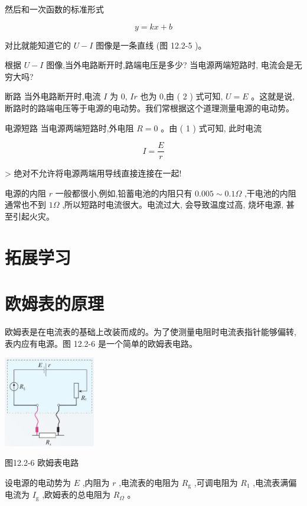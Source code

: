 \documentclass[10pt]{article}
\begin{document}
然后和一次函数的标准形式

\[
y = {kx} + b
\]

对比就能知道它的 \(U - I\) 图像是一条直线 (图 12.2-5 )。

根据 \(U - I\) 图像,当外电路断开时,路端电压是多少? 当电源两端短路时, 电流会是无穷大吗?

断路 当外电路断开时,电流 \(I\) 为 0, \({Ir}\) 也为 0,由 ( 2 ) 式可知, \(U = E\) 。这就是说,断路时的路端电压等于电源的电动势。我们常根据这个道理测量电源的电动势。

电源短路 当电源两端短路时,外电阻 \(R = 0\) 。由 ( 1 ) 式可知, 此时电流

\[
I = \frac{E}{r}
\]

\begin{mdframed}

> 绝对不允许将电源两端用导线直接连接在一起!

\end{mdframed}

电源的内阻 \(r\) 一般都很小,例如,铅蓄电池的内阻只有 \({0.005} \sim {0.1\Omega }\) ,干电池的内阻通常也不到 \({1\Omega }\) ,所以短路时电流很大。电流过大, 会导致温度过高, 烧坏电源, 甚至引起火灾。

\section*{拓展学习}

\section*{欧姆表的原理}

欧姆表是在电流表的基础上改装而成的。为了使测量电阻时电流表指针能够偏转, 表内应有电源。图 12.2-6 是一个简单的欧姆表电路。

\begin{center}
\includegraphics[max width=0.3\textwidth]{images/01911d5f-8e38-70c0-b5b8-2b399bd115b6_92_664003.jpg}
\end{center}

图12.2-6 欧姆表电路

设电源的电动势为 \(E\) ,内阻为 \(r\) ,电流表的电阻为 \({R}_{\mathrm{g}}\) ,可调电阻为 \({R}_{1}\) ,电流表满偏电流为 \({I}_{\mathrm{g}}\) ,欧姆表的总电阻为 \({R}_{\Omega }\) 。
\end{document}
